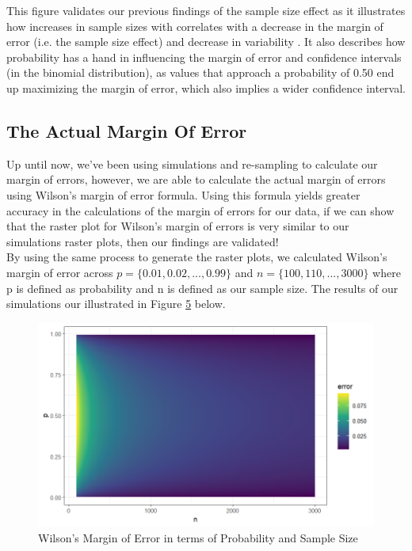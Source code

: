 \documentclass{article}\usepackage[]{graphicx}\usepackage[]{xcolor}
\begin{document}
\begin{multicols}{2}
This figure validates our previous findings of the sample size effect as it illustrates how increases in sample sizes with correlates with a decrease in the margin of error (i.e. the sample size effect) and decrease in variability . It also describes how probability has a hand in influencing the margin of error and confidence intervals (in the binomial distribution), as values that approach a probability of 0.50 end up maximizing the margin of error, which also implies a wider confidence interval.

\subsection{The Actual Margin Of Error}
Up until now, we've been using simulations and re-sampling to calculate our margin of errors, however, we are able to calculate the actual margin of errors using Wilson's margin of error formula. Using this formula yields greater accuracy in the calculations of the margin of errors for our data, if we can show that the raster plot for Wilson's margin of errors is very similar to our simulations raster plots, then our findings are validated! \\
By using the same process to generate the raster plots, we calculated Wilson's margin of error across $p = \{0.01, 0.02, ..., 0.99 \}$ and $n = \{100, 110, ..., 3000 \}$ where p is defined as probability and n is defined as our sample size. The results of our simulations our illustrated in Figure \hyperref[fig5]{5} below. 

\begin{figure}[H]
  \centering
  \includegraphics[width=\columnwidth]{Wilsons.png}
  \caption{Wilson's Margin of Error in terms of Probability and Sample Size}
  \label{fig5}
\end{figure}


\end{multicols}
\end{document}
